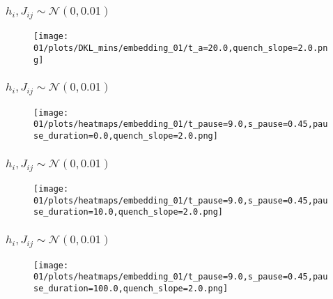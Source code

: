 \documentclass{beamer}
\begin{document}
\begin{frame}
    \frametitle{\( h_i, J_{ij} \sim \mathcal{N}(0, 0.01) \)}
    \begin{figure}
        \texttt{[image: 01/plots/DKL\_mins/embedding\_01/t\_a=20.0,quench\_slope=2.0.png]}
    \end{figure}
\end{frame}
\begin{frame}
    \frametitle{\( h_i, J_{ij} \sim \mathcal{N}(0, 0.01) \)}
    \begin{figure}
        \texttt{[image: 01/plots/heatmaps/embedding\_01/t\_pause=9.0,s\_pause=0.45,pause\_duration=0.0,quench\_slope=2.0.png]}
    \end{figure}
\end{frame}
\begin{frame}
    \frametitle{\( h_i, J_{ij} \sim \mathcal{N}(0, 0.01) \)}
    \begin{figure}
        \texttt{[image: 01/plots/heatmaps/embedding\_01/t\_pause=9.0,s\_pause=0.45,pause\_duration=10.0,quench\_slope=2.0.png]}
    \end{figure}
\end{frame}
\begin{frame}
    \frametitle{\( h_i, J_{ij} \sim \mathcal{N}(0, 0.01) \)}
    \begin{figure}
        \texttt{[image: 01/plots/heatmaps/embedding\_01/t\_pause=9.0,s\_pause=0.45,pause\_duration=100.0,quench\_slope=2.0.png]}
    \end{figure}
\end{frame}
\end{document}
